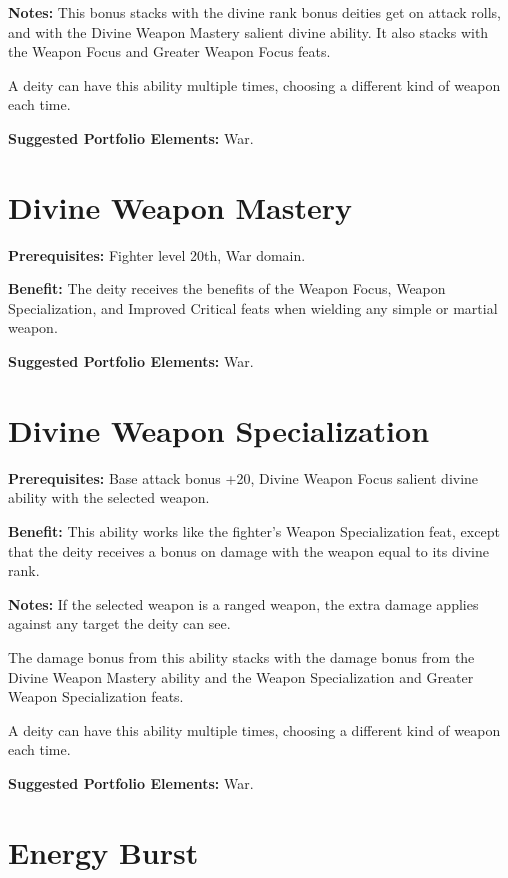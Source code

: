 \documentclass{article}
\begin{document}
\textbf{Notes:} This bonus stacks with the divine rank bonus deities get on attack 
rolls, and with the Divine Weapon Mastery salient divine ability. It also stacks 
with the Weapon Focus and Greater Weapon Focus feats.

A deity can have this ability multiple times, choosing a different kind of weapon 
each time.

\textbf{Suggested Portfolio Elements:} War.

\vspace{12pt}
\section*{Divine Weapon Mastery}

\textbf{Prerequisites:} Fighter level 20th, War domain.

\textbf{Benefit:} The deity receives the benefits of the Weapon Focus, Weapon Specialization, 
and Improved Critical feats when wielding any simple or martial weapon. 

\textbf{Suggested Portfolio Elements:} War.

\vspace{12pt}
\section*{Divine Weapon Specialization}

\textbf{Prerequisites:} Base attack bonus +20, Divine Weapon Focus salient divine 
ability with the selected weapon.

\textbf{Benefit:} This ability works like the fighter's Weapon Specialization feat, 
except that the deity receives a bonus on damage with the weapon equal to its divine 
rank.

\textbf{Notes:} If the selected weapon is a ranged weapon, the extra damage applies 
against any target the deity can see.

The damage bonus from this ability stacks with the damage bonus from the Divine 
Weapon Mastery ability and the Weapon Specialization and Greater Weapon Specialization 
feats.

A deity can have this ability multiple times, choosing a different kind of weapon 
each time.

\textbf{Suggested Portfolio Elements:} War.

\vspace{12pt}
\section*{Energy Burst}
\end{document}
